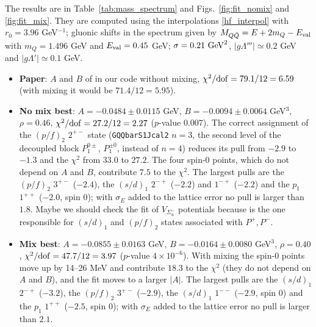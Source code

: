 \documentclass[11pt, a4paper]{article}
\begin{document}
The results are in Table~\ref{tab:mass_spectrum} and Figs.~\ref{fig:fit_nomix} and \ref{fig:fit_mix}. They are computed using the interpolations \eqref{hf_interpol} with $r_0=3.96$ GeV$^{-1}$; gluonic shifts in the spectrum given by $M_{Q\bar{Q}}=E+2m_Q-E_{\rm val}$ with $m_Q=1.496$ GeV and $E_{\rm val}=0.45$ GeV;  $\sigma=0.21\ {\rm GeV}^2$, $|g\Lambda'''|\simeq0.2$ GeV and $|g\Lambda'|\simeq 0.1$ GeV.
\begin{itemize}
    \item \textbf{Paper}: $A$ and $B$ of \cite{Soto:2023lbh} in our code without mixing, $\chi^2/{\rm dof}=79.1/12=6.59$ (with mixing it would be $71.4/12=5.95$).
    \item \textbf{No mix best}: $A=-0.0484\pm0.0115$ GeV, $B=-0.0094\pm0.0064$ GeV$^3$, $\rho=0.46$, $\chi^2/{\rm dof}=27.2/12=2.27$ ($p$-value $0.007$). The correct assignment of the $(p/f)_2$ $2^{+-}$ state (\texttt{GQQbarS1Jcal2} $n=3$, the second level of the decoupled block $P_1^{0\pm}$, $P_1^{\pm0}$, instead of $n=4$) reduces its pull from $-2.9$ to $-1.3$ and the $\chi^2$ from $33.0$ to $27.2$. The four spin-0 points, which do not depend on $A$ and $B$, contribute $7.5$ to the $\chi^2$. The largest pulls are the $(p/f)_2$ $3^{+-}$ ($-2.4$), the $(s/d)_1$ $2^{-+}$ ($-2.2$) and $1^{-+}$ ($-2.2$) and the $p_1$ $1^{++}$ ($-2.0$, spin 0); with $\sigma_E$ added to the lattice error no pull is larger than $1.8$. {\color{red} Maybe we should check the fit of $V_{\Sigma_u^-}$ potentials because is the one responsible for $(s/d)_1$ and $(p/f)_2$ states associated with $P^+,P^-$.}
    \item \textbf{Mix best}: $A=-0.0855\pm0.0163$ GeV, $B=-0.0164\pm0.0080$ GeV$^3$, $\rho=0.40$, $\chi^2/{\rm dof}=47.7/12=3.97$ ($p$-value $4\times10^{-6}$). With mixing the spin-0 points move up by 14--26 MeV and contribute $18.3$ to the $\chi^2$ (they do not depend on $A$ and $B$), and the fit moves to a larger $|A|$. The largest pulls are the $(s/d)_1$ $2^{-+}$ ($-3.2$), the $(p/f)_2$ $3^{+-}$ ($-2.9$), the $(s/d)_1$ $1^{--}$ ($-2.9$, spin 0) and the $p_1$ $1^{++}$ ($-2.5$, spin 0); with $\sigma_E$ added to the lattice error no pull is larger than $2.1$.


\end{itemize}
\end{document}
